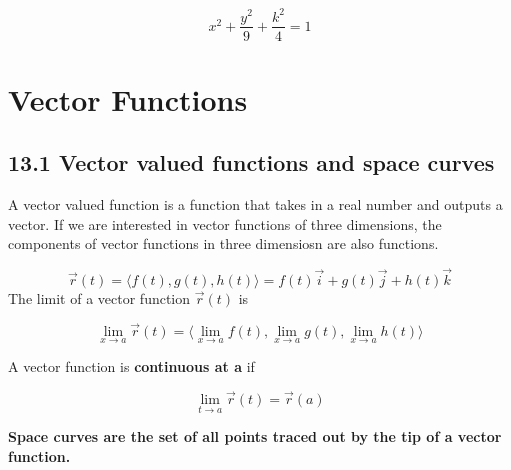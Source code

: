 \documentclass{article}
\begin{document}
	\[
		x^{2}+\frac{y^{2}}{9}+\frac{k^{2}}{4}= 1
	\]
	\pagebreak
	\section{Vector Functions}
	\subsection{13.1 Vector valued functions and space curves}

	A vector valued function is a function that takes in a real number and outputs
	a vector. If we are interested in vector functions of three dimensions, the
	components of vector functions in three dimensiosn are also functions.

	\[
		\vec{r}(t) = \langle f(t), g(t), h(t)\rangle = f(t)\vec{i}+g(t)\vec{j}+h(t)\vec
		{k}
	\]
	The limit of a vector function $\vec{r}(t)$ is

	\[
		\lim_{x \to a}\vec{r}(t) = \langle \lim_{x \to a}f(t), \lim_{x \to a}g(t), \lim
		_{x \to a}h(t) \rangle
	\]

	A vector function is \textbf{continuous at a} if

	\[
		\lim_{t \to a}\vec{r}(t) = \vec{r}(a)
	\]

	\textbf{Space curves are the set of all points traced out by the tip of a
	vector function.}
\end{document}

